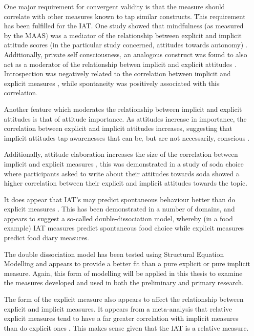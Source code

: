 One major requirement for convergent validity is that the measure should correlate with other measures known to tap similar constructs. This requirement has been fulfilled for the IAT. One study showed that mindfulness (as measured by the MAAS) was a mediator of the relationship between explicit and implicit attitude scores (in the particular study concerned, attitudes towards autonomy) \cite{Levesque2007}. Additionally, private self consciousness, an analogous construct was found to also act as a moderator of the relationship betwen implicit and explicit attitudes \cite{Gschwendner2006}. Introspection was negatively related to the correlation between implicit and explicit measures \cite{Hofmann2005}, while spontaneity was positively associated with this correlation. 

Another feature which moderates the relationship between implicit and explicit attitudes is that of attitude importance. As attitudes increase in importance, the correlation between explicit and implicit attitudes increases, suggesting that implicit attitudes tap awarenesses that can be, but are not necessarily, conscious \cite{Karpinski2005}. 

Additionally, attitude elaboration increases the size of the correlation between implicit and explicit measures \cite{Karpinski2005}, this was demonstrated in a study of soda choice where participants asked to write about their attitudes towards soda showed a higher correlation between their explicit and implicit attitudes towards the topic. 

It does appear that IAT's may predict spontaneous behaviour better than do explicit measures \cite{Asendorpf2002,Richetin2007,Perugini2005}. This has been demonstrated in a number of domains, and appears to suggest a so-called double-dissociation model, whereby (in a food example) IAT measures predict spontaneous food choice while explicit measures predict food diary measures. 

The double dissociation model has been tested using Structural Equation Modelling \cite{Nosek2007a,Perugini2005} and appears to provide a better fit than a pure explicit or pure implicit measure. Again, this form of modelling will be applied in this thesis to examine the measures developed and used in both the preliminary and primary research. 

The form of the explicit measure also appears to affect the relationship between explicit and implicit measures. It appears from a meta-analysis that relative explicit measures tend to have a far greater correlation with implicit measures than do explicit ones \cite{Hofmann2005}. This makes sense given that the IAT is a relative measure. 

